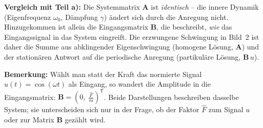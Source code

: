 \begin{beispiel}
\textbf{Vergleich mit Teil a):} Die Systemmatrix $\mathbf{A}$ ist
\emph{identisch} -- die innere Dynamik (Eigenfrequenz $\omega_0$, Dämpfung
$\gamma$) ändert sich durch die Anregung nicht. Hinzugekommen ist allein die
Eingangsmatrix $\mathbf{B}$, die beschreibt, \emph{wie} das Eingangssignal in das
System eingreift. Die erzwungene Schwingung in Bild~2 ist daher die Summe aus
abklingender Eigenschwingung (homogene Lösung, $\mathbf{A}$) und der stationären
Antwort auf die periodische Anregung (partikuläre Lösung, $\mathbf{B}\,u$).

\textbf{Bemerkung:} Wählt man statt der Kraft das normierte Signal
$u(t) = \cos(\omega t)$ als Eingang, so wandert die Amplitude in die
Eingangsmatrix: $\mathbf{B} = (0,\; \tfrac{\hat{F}}{m})^{\mathsf{T}}$. Beide
Darstellungen beschreiben dasselbe System; sie unterscheiden sich nur in der
Frage, ob der Faktor $\hat{F}$ zum Signal $u$ oder zur Matrix $\mathbf{B}$
gezählt wird.

\end{beispiel}
